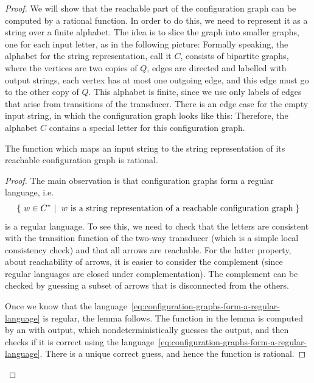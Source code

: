 \begin{proof}
    We will show that the reachable part of the configuration graph can be computed by a rational function. In order to do this, we need to represent it as a string over a finite alphabet. The idea is to slice the graph into smaller graphs, one for each input letter, as in the following picture:
    Formally speaking, the alphabet for the string representation, call it $C$, consists of bipartite  graphs, where the vertices are two copies of $Q$, edges are directed and labelled with output strings, each vertex has at most one outgoing edge, and this edge must go to the other copy of $Q$. This alphabet is finite, since we use only labels of edges that arise from transitions of the transducer. There is an edge case for the empty input string, in which the configuration graph looks like this: 
    Therefore, the alphabet $C$ contains a special letter for this configuration graph. 
    \begin{lemma}\label{lem:compute-configuration-graph}
        The function which maps an input string to the string representation of its reachable configuration graph is rational.
    \end{lemma}

    \begin{proof}
        The main observation is that configuration graphs form a regular language, i.e.~
        \begin{align}
            \label{eq:configuration-graphs-form-a-regular-language}
             \setbuild{w \in C^*}{$w$ is a string representation of a reachable configuration graph}
        \end{align}
        is a regular language. To see this, we need to check that the letters are consistent with the transition function of the two-way transducer (which is a simple local consistency check) and that all arrows are reachable. For the latter property, about reachability of arrows, it is easier to consider the complement (since regular languages are closed under complementation). The complement can be checked by guessing a subset of arrows that is disconnected from the others. 

        Once we know that the language~\eqref{eq:configuration-graphs-form-a-regular-language} is regular, the lemma follows. The function in the lemma is computed by an \nfa with output, which nondeterministically guesses the output, and then checks if it is correct using the language~\eqref{eq:configuration-graphs-form-a-regular-language}. There is a unique correct guess, and hence the function is rational.
    \end{proof}


\end{proof}
